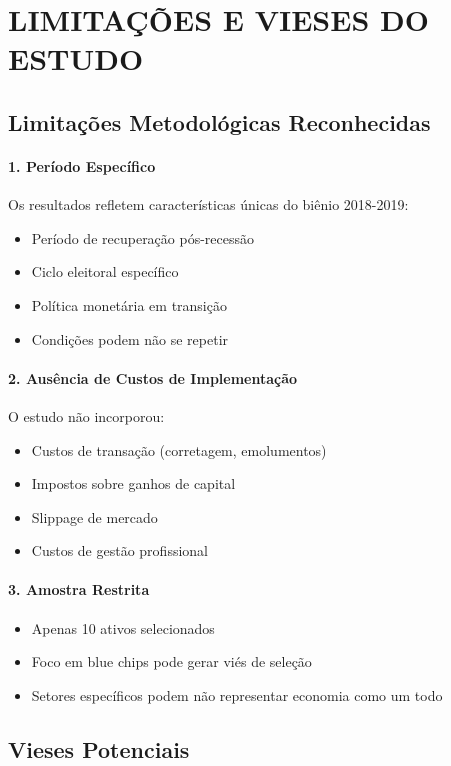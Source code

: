 \section{LIMITAÇÕES E VIESES DO ESTUDO}

\subsection{Limitações Metodológicas Reconhecidas}

\paragraph{1. Período Específico}
Os resultados refletem características únicas do biênio 2018-2019:
\begin{itemize}
    \item Período de recuperação pós-recessão
    \item Ciclo eleitoral específico
    \item Política monetária em transição
    \item Condições podem não se repetir
\end{itemize}

\paragraph{2. Ausência de Custos de Implementação}
O estudo não incorporou:
\begin{itemize}
    \item Custos de transação (corretagem, emolumentos)
    \item Impostos sobre ganhos de capital
    \item Slippage de mercado
    \item Custos de gestão profissional
\end{itemize}

\paragraph{3. Amostra Restrita}
\begin{itemize}
    \item Apenas 10 ativos selecionados
    \item Foco em blue chips pode gerar viés de seleção
    \item Setores específicos podem não representar economia como um todo
\end{itemize}

\subsection{Vieses Potenciais}


